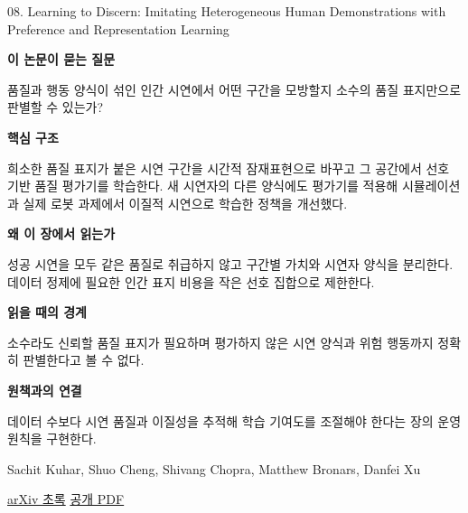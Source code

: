 \documentclass[11pt,openany]{book}
\begin{document}
\begin{termcard}{08. Learning to Discern: Imitating Heterogeneous Human Demonstrations with Preference and Representation Learning}

\par

\medskip

{\sffamily\bfseries\color{deepblue} 이 논문이 묻는 질문}\par

품질과 행동 양식이 섞인 인간 시연에서 어떤 구간을 모방할지 소수의 품질 표지만으로 판별할 수 있는가?

\smallskip

{\sffamily\bfseries\color{deepblue} 핵심 구조}\par

희소한 품질 표지가 붙은 시연 구간을 시간적 잠재표현으로 바꾸고 그 공간에서 선호 기반 품질 평가기를 학습한다. 새 시연자의 다른 양식에도 평가기를 적용해 시뮬레이션과 실제 로봇 과제에서 이질적 시연으로 학습한 정책을 개선했다.

\smallskip

{\sffamily\bfseries\color{deepblue} 왜 이 장에서 읽는가}\par

성공 시연을 모두 같은 품질로 취급하지 않고 구간별 가치와 시연자 양식을 분리한다. 데이터 정제에 필요한 인간 표지 비용을 작은 선호 집합으로 제한한다.

\smallskip

{\sffamily\bfseries\color{coral} 읽을 때의 경계}\par

소수라도 신뢰할 품질 표지가 필요하며 평가하지 않은 시연 양식과 위험 행동까지 정확히 판별한다고 볼 수 없다.

\smallskip

{\sffamily\bfseries\color{teal} 원책과의 연결}\par

데이터 수보다 시연 품질과 이질성을 추적해 학습 기여도를 조절해야 한다는 장의 운영 원칙을 구현한다.

\medskip

{\footnotesize\color{muted} Sachit Kuhar, Shuo Cheng, Shivang Chopra, Matthew Bronars, Danfei Xu\par

\href{https://arxiv.org/abs/2310.14196}{arXiv 초록} \quad \href{https://arxiv.org/pdf/2310.14196}{공개 PDF}\par}

\end{termcard}
\end{document}
